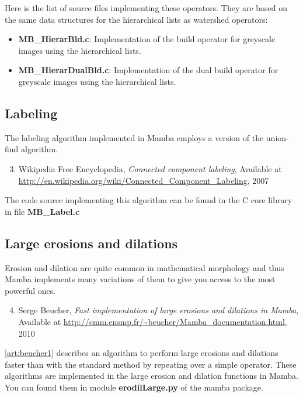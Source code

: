 \documentclass[a4paper,10pt,oneside]{article}
\begin{document}
Here is the list of source files implementing these operators. They are based on
the same data structures for the hierarchical lists as watershed operators:

\begin{itemize}
\item \textbf{MB\_HierarBld.c}: Implementation of the build operator for
greyscale images using the hierarchical lists.
\item \textbf{MB\_HierarDualBld.c}: Implementation of the dual build operator
for greyscale images using the hierarchical lists.
\end{itemize}

\subsection{Labeling}

The labeling algorithm implemented in Mamba employs a version of the union-find 
algorithm.

\begin{enumerate}
\setcounter{enumi}{2}
\item \label{art:wikipedia} Wikipedia Free Encyclopedia, 
\emph{Connected component labeling},
Available at \url{http://en.wikipedia.org/wiki/Connected\_Component\_Labeling}, 2007
\end{enumerate}

The code source implementing this algorithm can be found in the C core library
in file \textbf{MB\_Label.c}

\subsection{Large erosions and dilations}
\label{cha:opt_ero_dil}

Erosion and dilation are quite common in mathematical morphology and thus Mamba
implements many variations of them to give you access to the most powerful ones.

\begin{enumerate}
\setcounter{enumi}{3}
\item \label{art:beucher1} Serge Beucher,
\emph{Fast implementation of large erosions and dilations in Mamba},
Available at \url{http://cmm.ensmp.fr/\~beucher/Mamba\_documentation.html}, 2010
\end{enumerate}

\ref{art:beucher1} describes an algorithm to perform large erosions and
dilations faster than with the standard method by repeating over a simple
operator. These algorithms are implemented in the large erosion and dilation
functions in Mamba. You can found them in module \textbf{erodilLarge.py} of
the mamba package.
\end{document}
